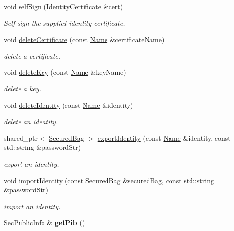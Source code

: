 \begin{DoxyCompactItemize}
void \hyperlink{classndn_1_1security_1_1KeyChain_a332ab9ef9cf7044c9f15df3b516e2aae}{self\+Sign} (\hyperlink{classndn_1_1IdentityCertificate}{Identity\+Certificate} \&cert)
\begin{DoxyCompactList}\small\item\em Self-\/sign the supplied identity certificate. \end{DoxyCompactList}\item 
void \hyperlink{classndn_1_1security_1_1KeyChain_ac5389a6d8c4eac92c7436af9411747a9}{delete\+Certificate} (const \hyperlink{classndn_1_1Name}{Name} \&certificate\+Name)
\begin{DoxyCompactList}\small\item\em delete a certificate. \end{DoxyCompactList}\item 
void \hyperlink{classndn_1_1security_1_1KeyChain_a30a89030ae7bf9fc386ff11484b32b06}{delete\+Key} (const \hyperlink{classndn_1_1Name}{Name} \&key\+Name)
\begin{DoxyCompactList}\small\item\em delete a key. \end{DoxyCompactList}\item 
void \hyperlink{classndn_1_1security_1_1KeyChain_a116937444718372fa29e414ab40a6321}{delete\+Identity} (const \hyperlink{classndn_1_1Name}{Name} \&identity)
\begin{DoxyCompactList}\small\item\em delete an identity. \end{DoxyCompactList}\item 
shared\+\_\+ptr$<$ \hyperlink{classndn_1_1SecuredBag}{Secured\+Bag} $>$ \hyperlink{classndn_1_1security_1_1KeyChain_a0177b228c915bc9f2c4ae57617dd8bfb}{export\+Identity} (const \hyperlink{classndn_1_1Name}{Name} \&identity, const std\+::string \&password\+Str)
\begin{DoxyCompactList}\small\item\em export an identity. \end{DoxyCompactList}\item 
void \hyperlink{classndn_1_1security_1_1KeyChain_a753d555c36e02dbc77fd7e9a109ae770}{import\+Identity} (const \hyperlink{classndn_1_1SecuredBag}{Secured\+Bag} \&secured\+Bag, const std\+::string \&password\+Str)
\begin{DoxyCompactList}\small\item\em import an identity. \end{DoxyCompactList}\item 
\hyperlink{classndn_1_1SecPublicInfo}{Sec\+Public\+Info} \& {\bfseries get\+Pib} ()\hypertarget{classndn_1_1security_1_1KeyChain_a8d1f43709d1107d17f2ba2217d41f6de}{}\label{classndn_1_1security_1_1KeyChain_a8d1f43709d1107d17f2ba2217d41f6de}


\end{DoxyCompactItemize}
